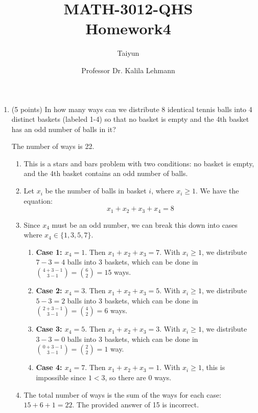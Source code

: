 \documentclass{article}
\author{Taiyun}
\title{MATH-3012-QHS \\ Homework4}
\date{Professor Dr. Kalila Lehmann}
\begin{document}
\maketitle









\begin{enumerate}
  \item (5 points) In how many ways can we distribute 8 identical tennis balls into 4 distinct baskets (labeled 1-4) so that no basket is empty and the 4th basket has an odd number of balls in it?
  \begin{answer}
    The number of ways is 22.
    \begin{enumerate}
      \item This is a stars and bars problem with two conditions: no basket is empty, and the 4th basket contains an odd number of balls.
      \item Let $x_i$ be the number of balls in basket $i$, where $x_i \geq 1$. We have the equation:
      $$
      x_1 + x_2 + x_3 + x_4 = 8
      $$
      \item Since $x_4$ must be an odd number, we can break this down into cases where $x_4 \in \{1, 3, 5, 7\}$.
      \begin{enumerate}
        \item \textbf{Case 1: $x_4 = 1$}. Then $x_1+x_2+x_3=7$. 
        With $x_i \geq 1$, we distribute $7-3=4$ balls into 3 
        baskets, which can be done in $\binom{4+3-1}{3-1} = \binom{6}{2} = 15$ ways.
        \item \textbf{Case 2: $x_4 = 3$}. Then $x_1+x_2+x_3=5$. 
        With $x_i \geq 1$, we distribute $5-3=2$ balls into 3 
        baskets, which can be done in $\binom{2+3-1}{3-1} = \binom{4}{2} = 6$ ways.
        \item \textbf{Case 3: $x_4 = 5$}. Then $x_1+x_2+x_3=3$. 
        With $x_i \geq 1$, we distribute $3-3=0$ balls into 3 
        baskets, which can be done in $\binom{0+3-1}{3-1} = \binom{2}{2} = 1$ way.
        \item \textbf{Case 4: $x_4 = 7$}. Then $x_1+x_2+x_3=1$. 
        With $x_i \geq 1$, this is impossible since $1 < 3$, so there are 0 ways.
      \end{enumerate}
      \item The total number of ways is the sum of the ways for 
      each case: $15 + 6 + 1 = 22$. The provided answer of 15 is incorrect.
    \end{enumerate}
  \end{answer}



\end{enumerate}
\end{document}
